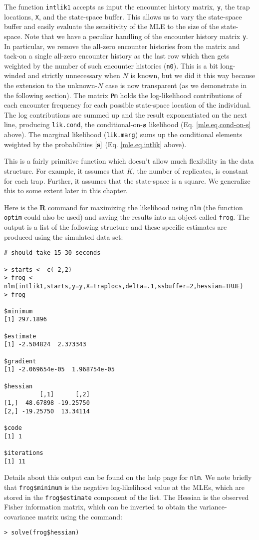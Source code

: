 The function \mbox{\tt intlik1} accepts as input the encounter history
matrix, \mbox{\tt y}, the
trap locations, \mbox{\tt X}, and the state-space buffer. This allows us to
vary the state-space buffer and easily evaluate the sensitivity of the
MLE to the size of the state-space.  Note that we have a peculiar
handling of the encounter history matrix \mbox{\tt y}. In particular, we remove
the all-zero encounter histories from the matrix and tack-on a single
all-zero encounter history as the last row which then gets weighted by
the number of such encounter histories (\mbox{\tt n0}). This is a bit
long-winded and strictly unnecessary when $N$ is known, but we did it
this way because the extension to the unknown-$N$ case is now
transparent (as we demonstrate in the following section).  The matrix
\mbox{\tt Pm} holds the log-likelihood contributions of each encounter
frequency for each possible state-space location of the individual.
The log contributions are summed up and the result exponentiated on
the next line, producing \mbox{\tt lik.cond}, the conditional-on-${\bf s}$
likelihood (Eq. \ref{mle.eq.cond-on-s} above). The marginal likelihood
(\mbox{\tt lik.marg}) sums up the conditional elements weighted by the probabilities
$[{\bf s}]$ (Eq. \ref{mle.eq.intlik} above).  

This is a fairly
primitive function which doesn't allow much flexibility in the data
structure. For example, it assumes that $K$, the number of replicates,
is constant for each trap. Further, it assumes that the state-space is
a square. We generalize this to some extent later in this chapter.

Here is the {\bf R} command for maximizing the likelihood using
\mbox{\tt nlm} (the function \mbox{\tt optim} could also be used) and saving the
results into an object called \mbox{\tt frog}.  The output is a list of the
following structure and these specific estimates are produced using
the simulated data set:

{\small 
\begin{verbatim}
# should take 15-30 seconds

> starts <- c(-2,2)
> frog <- nlm(intlik1,starts,y=y,X=traplocs,delta=.1,ssbuffer=2,hessian=TRUE)
> frog

$minimum
[1] 297.1896

$estimate
[1] -2.504824  2.373343

$gradient
[1] -2.069654e-05  1.968754e-05

$hessian
          [,1]      [,2]
[1,]  48.67898 -19.25750
[2,] -19.25750  13.34114

$code
[1] 1

$iterations
[1] 11
\end{verbatim}
} 
Details about this output can be found on the help page for
\mbox{\tt nlm}. We note briefly that \mbox{\tt frog\$minimum} is the
negative log-likelihood value at the MLEs, which are stored in the
\mbox{\tt frog\$estimate} component of the list. The Hessian is the
observed Fisher information matrix, which can be inverted to obtain
the variance-covariance matrix using the command:
\begin{verbatim}
> solve(frog$hessian)
\end{verbatim}


